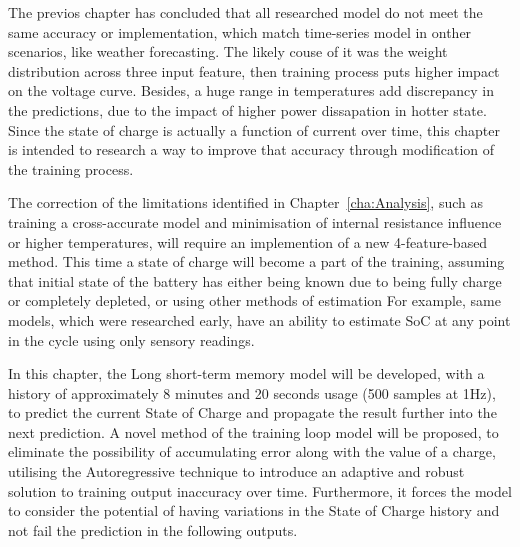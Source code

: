 The previos chapter has concluded that all researched model do not meet the same accuracy or implementation, which match time-series model in onther scenarios, like weather forecasting.
The likely couse of it was the weight distribution across three input feature, then training process puts higher impact on the voltage curve.
Besides, a huge range in temperatures add discrepancy in the predictions, due to the impact of higher power dissapation in hotter state.
Since the state of charge is actually a function of current over time, this chapter is intended to research a way to improve that accuracy through modification of the training process.


%
%
The correction of the limitations identified in Chapter~\ref{cha:Analysis}, such as training a cross-accurate model and minimisation of internal resistance influence or higher temperatures, will require an implemention of a new 4-feature-based method.
This time a state of charge will become a part of the training, assuming that initial state of the battery has either being known due to being fully charge or completely depleted, or using other methods of estimation
For example, same models, which were researched early, have an ability to estimate SoC at any point in the cycle using only sensory readings.

%
%
In this chapter, the Long short-term memory model will be developed, with a history of approximately 8 minutes and 20 seconds usage (500 samples at 1Hz), to predict the current State of Charge and propagate the result further into the next prediction.
A novel method of the training loop model will be proposed, to eliminate the possibility of accumulating error along with the value of a charge, utilising the Autoregressive technique to introduce an adaptive and robust solution to training output inaccuracy over time.
Furthermore, it forces the model to consider the potential of having variations in the State of Charge history and not fail the prediction in the following outputs.


